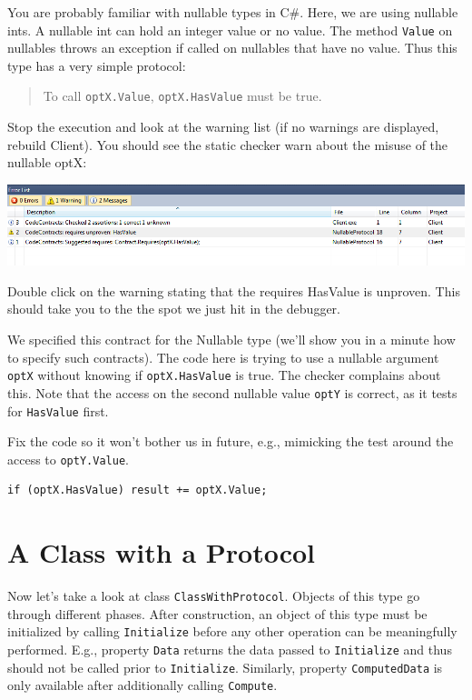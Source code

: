 \documentclass{article}
\newcommand{\code}[1]{\lstinline{#1}}
\begin{document}
You are probably familiar with nullable types in C\#. Here, we are
using nullable ints. A nullable int can hold an integer value or no
value. The method \code{Value} on nullables throws an exception if
called on nullables that have no value. Thus this type has a very
simple protocol:
\begin{quote}
To call \code{optX.Value}, \code{optX.HasValue} must be true.
\end{quote}
Stop the execution and look at the warning list (if no warnings
are displayed, rebuild Client).
You should see the static checker warn about the misuse of the
nullable \textsf{optX}:
\begin{center}
  \includegraphics[width=1\columnwidth]{errors1.png}
\end{center}
Double click on the warning stating
that the requires HasValue is unproven. This should take you to the
the spot we just hit in the debugger.

We specified this contract for the Nullable type (we'll show you in a
minute how to specify such contracts). The code here is trying to use
a nullable argument \code{optX} without knowing if
\code{optX.HasValue} is true. The checker complains about this. Note
that the access on the second nullable value \code{optY} is correct,
as it tests for \code{HasValue} first.

Fix the code so it won't bother us in future, e.g., mimicking the test
around the access to \code{optY.Value}.
\begin{lstlisting}
if (optX.HasValue) result += optX.Value;
\end{lstlisting}

\section{A Class with a Protocol}
Now let's take a look at class \code{ClassWithProtocol}. Objects of
this type go through different phases. After construction, an object
of this type must be initialized by calling \code{Initialize} before
any other operation can be meaningfully performed. E.g., property
\code{Data} returns the data passed to \code{Initialize} and thus
should not be called prior to \code{Initialize}. Similarly, property
\code{ComputedData} is only available after additionally calling
\code{Compute}.
\end{document}
